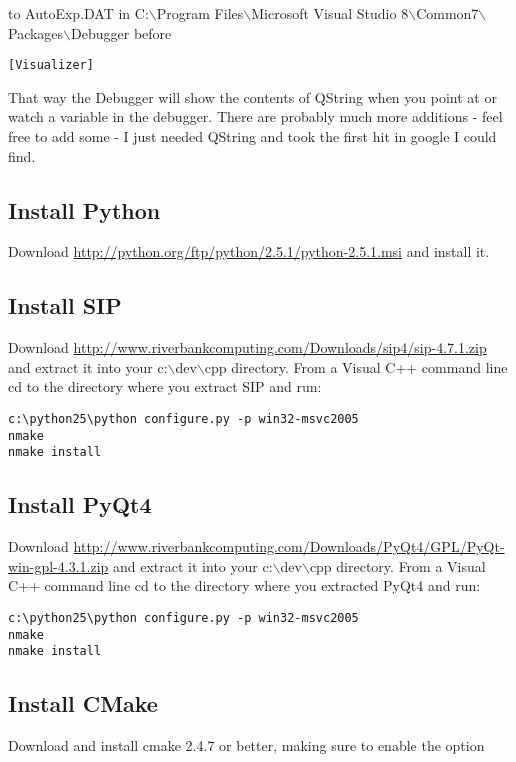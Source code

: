 to AutoExp.DAT in C:$\backslash$Program Files$\backslash$Microsoft Visual Studio 8$\backslash$Common7$\backslash$Packages$\backslash$Debugger before 

\begin{verbatim}
[Visualizer]
\end{verbatim}

That way the Debugger will show the contents of QString when you point at or
watch a variable in the debugger.  There are probably much more additions -
feel free to add some - I just needed QString and took the first hit in google
I could find.

\subsection{Install Python}
Download \url{http://python.org/ftp/python/2.5.1/python-2.5.1.msi} and install it.

\subsection{Install SIP}
Download \url{http://www.riverbankcomputing.com/Downloads/sip4/sip-4.7.1.zip} and extract it 
into your c:$\backslash$dev$\backslash$cpp directory.
From a Visual C++ command line cd to the directory where you extract SIP and run:

\begin{verbatim}
c:\python25\python configure.py -p win32-msvc2005
nmake
nmake install
\end{verbatim}

\subsection{Install PyQt4}
Download \url{http://www.riverbankcomputing.com/Downloads/PyQt4/GPL/PyQt-win-gpl-4.3.1.zip} and extract it 
into your c:$\backslash$dev$\backslash$cpp directory.
From a Visual C++ command line cd to the directory where you extracted PyQt4 and run:

\begin{verbatim}
c:\python25\python configure.py -p win32-msvc2005
nmake
nmake install
\end{verbatim}

\subsection{Install CMake}
Download and install cmake 2.4.7 or better, making sure to enable the 
option

